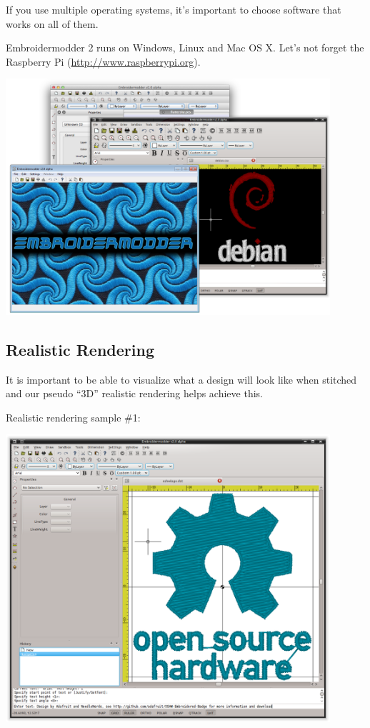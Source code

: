 \documentclass[a4paper, 11pt]{report}
\begin{document}
If you use multiple operating systems, it's important to choose software that works on all of them.

Embroidermodder 2 runs on Windows, Linux and Mac OS X. Let's not forget the Raspberry Pi (\url{http://www.raspberrypi.org}).

\begin{center}
\includegraphics[width=0.9\textwidth]{images/features-platforms-1.png}
\end{center}

\subsection{Realistic Rendering}

It is important to be able to visualize what a design will look like when stitched and our pseudo ``3D'' realistic rendering helps achieve this.

Realistic rendering sample \#1:

\includegraphics[width=0.9\textwidth]{images/features-realrender-1.png}
\end{document}

